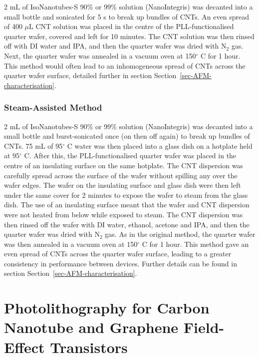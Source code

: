 \documentclass[
  a4paper,
]{scrbook}
\begin{document}
2 mL of IsoNanotubes-S 90\% or 99\% solution (NanoIntegris) was decanted
into a small bottle and sonicated for 5 s to break up bundles of CNTs.
An even spread of 400 \(\mu\)L CNT solution was placed in the centre of
the PLL-functionalised quarter wafer, covered and left for 10 minutes.
The CNT solution was then rinsed off with DI water and IPA, and then the
quarter wafer was dried with N\(_2\) gas. Next, the quarter wafer was
annealed in a vacuum oven at 150\(^\circ\) C for 1 hour. This method
would often lead to an inhomogeneous spread of CNTs across the quarter
wafer surface, detailed further in section
Section~\ref{sec-AFM-characterisation}.

\hypertarget{steam-assisted-method}{%
\subsubsection*{Steam-Assisted Method}\label{steam-assisted-method}}

2 mL of IsoNanotubes-S 90\% or 99\% solution (NanoIntegris) was decanted
into a small bottle and burst-sonicated once (on then off again) to
break up bundles of CNTs. 75 mL of 95\(^\circ\) C water was then placed
into a glass dish on a hotplate held at 95\(^\circ\) C. After this, the
PLL-functionalised quarter wafer was placed in the centre of an
insulating surface on the same hotplate. The CNT dispersion was
carefully spread across the surface of the wafer without spilling any
over the wafer edges. The wafer on the insulating surface and glass dish
were then left under the same cover for 2 minutes to expose the wafer to
steam from the glass dish. The use of an insulating surface meant that
the wafer and CNT dispersion were not heated from below while exposed to
steam. The CNT dispersion was then rinsed off the wafer with DI water,
ethanol, acetone and IPA, and then the quarter wafer was dried with
N\(_2\) gas. As in the original method, the quarter wafer was then
annealed in a vacuum oven at 150\(^\circ\) C for 1 hour. This method
gave an even spread of CNTs across the quarter wafer surface, leading to
a greater consistency in performance between devices. Further details
can be found in section Section~\ref{sec-AFM-characterisation}.

\hypertarget{photolithography-for-carbon-nanotube-and-graphene-field-effect-transistors}{%
\section{Photolithography for Carbon Nanotube and Graphene Field-Effect
Transistors}\label{photolithography-for-carbon-nanotube-and-graphene-field-effect-transistors}}
\end{document}
